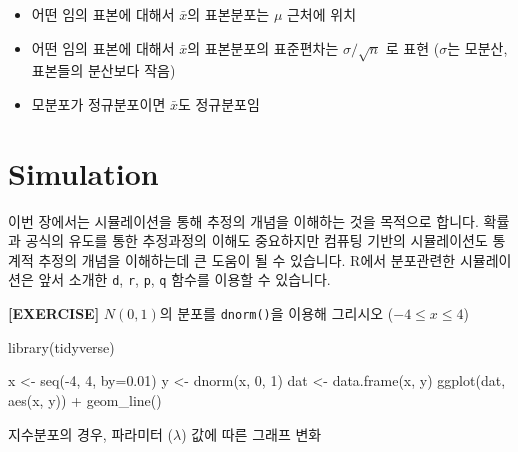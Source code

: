\documentclass[
]{book}
\newenvironment{Shaded}{\begin{snugshade}}{\end{snugshade}}
\newcommand{\AttributeTok}[1]{\textcolor[rgb]{0.77,0.63,0.00}{#1}}
\newcommand{\DecValTok}[1]{\textcolor[rgb]{0.00,0.00,0.81}{#1}}
\newcommand{\FloatTok}[1]{\textcolor[rgb]{0.00,0.00,0.81}{#1}}
\newcommand{\FunctionTok}[1]{\textcolor[rgb]{0.00,0.00,0.00}{#1}}
\newcommand{\NormalTok}[1]{#1}
\newcommand{\OtherTok}[1]{\textcolor[rgb]{0.56,0.35,0.01}{#1}}
\newcommand{\SpecialCharTok}[1]{\textcolor[rgb]{0.00,0.00,0.00}{#1}}
\providecommand{\tightlist}{%
  \setlength{\itemsep}{0pt}\setlength{\parskip}{0pt}}
\begin{document}
\begin{itemize}
\tightlist
\item
  어떤 임의 표본에 대해서 \(\bar{x}\)의 표본분포는 \(\mu\) 근처에 위치
\item
  어떤 임의 표본에 대해서 \(\bar{x}\)의 표본분포의 표준편차는 \(\sigma/\sqrt{n}\) 로 표현 (\(\sigma\)는 모분산, 표본들의 분산보다 작음)
\item
  모분포가 정규분포이면 \(\bar{x}\)도 정규분포임
\end{itemize}

\hypertarget{simulation}{%
\section{Simulation}\label{simulation}}

이번 장에서는 시뮬레이션을 통해 추정의 개념을 이해하는 것을 목적으로 합니다. 확률과 공식의 유도를 통한 추정과정의 이해도 중요하지만 컴퓨팅 기반의 시뮬레이션도 통계적 추정의 개념을 이해하는데 큰 도움이 될 수 있습니다. R에서 분포관련한 시뮬레이션은 앞서 소개한 \texttt{d}, \texttt{r}, \texttt{p}, \texttt{q} 함수를 이용할 수 있습니다.

\textbf{{[}EXERCISE{]}} \(N(0, 1)\)의 분포를 \texttt{dnorm()}을 이용해 그리시오 (\(-4 \le x \le 4\))

\begin{Shaded}
\begin{Highlighting}[]
\FunctionTok{library}\NormalTok{(tidyverse)}

\NormalTok{x }\OtherTok{\textless{}{-}} \FunctionTok{seq}\NormalTok{(}\SpecialCharTok{{-}}\DecValTok{4}\NormalTok{, }\DecValTok{4}\NormalTok{, }\AttributeTok{by=}\FloatTok{0.01}\NormalTok{)}
\NormalTok{y }\OtherTok{\textless{}{-}} \FunctionTok{dnorm}\NormalTok{(x, }\DecValTok{0}\NormalTok{, }\DecValTok{1}\NormalTok{)}
\NormalTok{dat }\OtherTok{\textless{}{-}} \FunctionTok{data.frame}\NormalTok{(x, y)}
\FunctionTok{ggplot}\NormalTok{(dat, }\FunctionTok{aes}\NormalTok{(x, y)) }\SpecialCharTok{+}
  \FunctionTok{geom\_line}\NormalTok{()}
\end{Highlighting}
\end{Shaded}

지수분포의 경우, 파라미터 (\(\lambda\)) 값에 따른 그래프 변화
\end{document}

